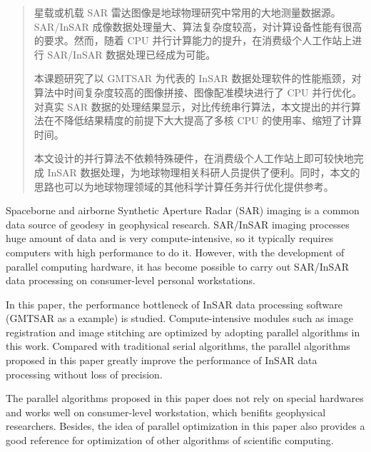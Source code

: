 ﻿\begin{abstract}

星载或机载 SAR 雷达图像是地球物理研究中常用的大地测量数据源。SAR/InSAR 成像数据处理量大、算法复杂度较高，对计算设备性能有很高的要求。然而，随着 CPU 并行计算能力的提升，在消费级个人工作站上进行 SAR/InSAR 数据处理已经成为可能。

本课题研究了以 GMTSAR 为代表的 InSAR 数据处理软件的性能瓶颈，对算法中时间复杂度较高的图像拼接、图像配准模块进行了 CPU 并行优化。对真实 SAR 数据的处理结果显示，对比传统串行算法，本文提出的并行算法在不降低结果精度的前提下大大提高了多核 CPU 的使用率、缩短了计算时间。

本文设计的并行算法不依赖特殊硬件，在消费级个人工作站上即可较快地完成 InSAR 数据处理，为地球物理相关科研人员提供了便利。同时，本文的思路也可以为地球物理领域的其他科学计算任务并行优化提供参考。
    
\end{abstract}

\begin{enabstract}
Spaceborne and airborne Synthetic Aperture Radar (SAR) imaging is a common data source of geodesy in geophysical research. SAR/InSAR imaging processes huge amount of data and is very compute-intensive, so it typically requires computers with high performance to do it. However, with the development of parallel computing hardware, it has become possible to carry out SAR/InSAR data processing on consumer-level personal workstations.

In this paper, the performance bottleneck of InSAR data processing software (GMTSAR as a example) is studied. Compute-intensive modules such as image registration and image stitching are optimized by adopting parallel algorithms in this work. Compared with traditional serial algorithms, the parallel algorithms proposed in this paper greatly improve the performance of InSAR data processing without loss of precision.

The parallel algorithms proposed in this paper does not rely on special hardwares and works well on consumer-level workstation, which benifits geophysical researchers. Besides, the idea of parallel optimization in this paper also provides a good reference for optimization of other algorithms of scientific computing.

\end{enabstract}
